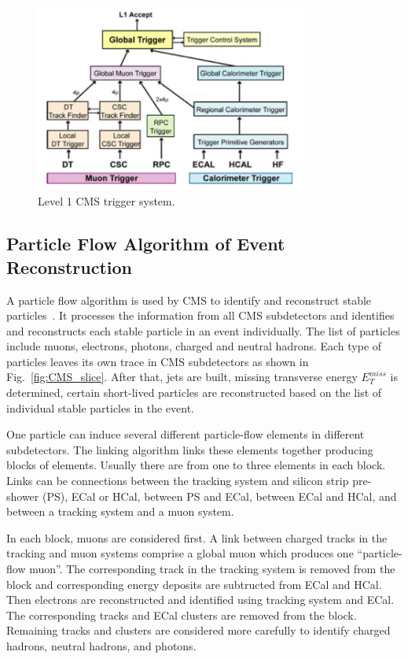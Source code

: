 \begin{figure}[htb]
  \begin{center}
    \includegraphics[width=0.8\textwidth]{../figs/Exp/trigger_L1.png}
    \caption{Level 1 CMS trigger system.}
    \label{fig:trigger_L1}
  \end{center}
\end{figure}

\subsection{Particle Flow Algorithm of Event Reconstruction}

A particle flow algorithm is used by CMS to identify and reconstruct stable particles~\cite{ref_ParticleFlowAlg}. It processes the information from all CMS subdetectors and identifies and reconstructs each stable particle in an event individually. The list of particles include muons, electrons, photons, charged and neutral hadrons. Each type of particles leaves its own trace in CMS subdetectors as shown in Fig.~\ref{fig:CMS_slice}. After that, jets are built, missing transverse energy $E_T^{miss}$ is determined, certain short-lived particles are reconstructed based on the list of individual stable particles in the event.

One particle can induce several different particle-flow elements in different subdetectors. The linking algorithm links these elements together producing blocks of elements. Usually there are from one to three elements in each block. Links can be connections between the tracking system and silicon strip pre-shower (PS), ECal or HCal, between PS and ECal, between ECal and HCal, and between a tracking system and a muon system. 

In each block, muons are considered first. A link between charged tracks in the tracking and muon systems comprise a global muon which produces one ``particle-flow muon''. The corresponding track in the tracking system is removed from the block and corresponding energy deposits are subtructed from ECal and HCal. Then electrons are reconstructed and identified using tracking system and ECal. The corresponding tracks and ECal clusters are removed from the block. Remaining tracks and clusters are considered more carefully to identify charged hadrons, neutral hadrons, and photons.

